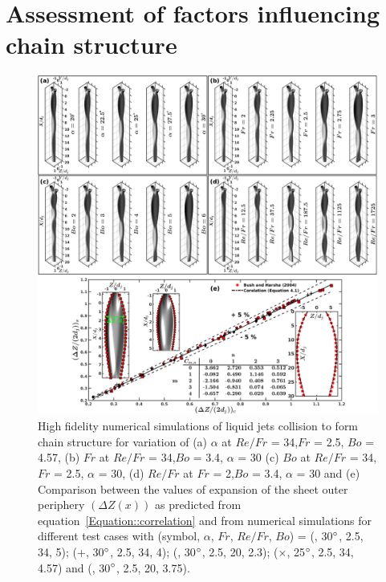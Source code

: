 \documentclass{jfm}
\begin{document}
\section{Assessment of factors influencing chain structure}
\begin{figure}
	\centering
	\includegraphics[width=\linewidth]{Figure6}
	\caption{High fidelity numerical simulations of liquid jets collision to form chain structure for variation of (a) $\alpha$ at $Re/Fr$ = 34,$Fr$ = 2.5, $Bo$ = 4.57, (b) $Fr$ at $Re/Fr$ = 34,$Bo$ = 3.4, $\alpha$ =  30 (c) $Bo$ at $Re/Fr$ = 34,$Fr$ = 2.5, $\alpha$ = 30, (d)  $Re/Fr$ at $Fr$ = 2,$Bo$ = 3.4, $\alpha$ = 30 and (e) Comparison between the values of expansion of the sheet outer periphery $\left(\Delta Z(x)\right)$ as predicted from equation~\ref{Equation::correlation} and from numerical simulations for different test cases with (symbol, $\alpha$, $Fr$, $Re/Fr$, $Bo$) = (\protect\MarkerSquareRed, 30$\degree$, 2.5, 34, 5); (+, 30$\degree$, 2.5, 34, 4); (\protect \MarkerDiamondBlack, 30$\degree$, 2.5, 20, 2.3); ($\times$, 25$\degree$, 2.5, 34, 4.57) and (\protect \MarkerCircleRed, 30$\degree$, 2.5, 20, 3.75).}
	\label{Figure::phaseContours}%
\end{figure}
\end{document}
